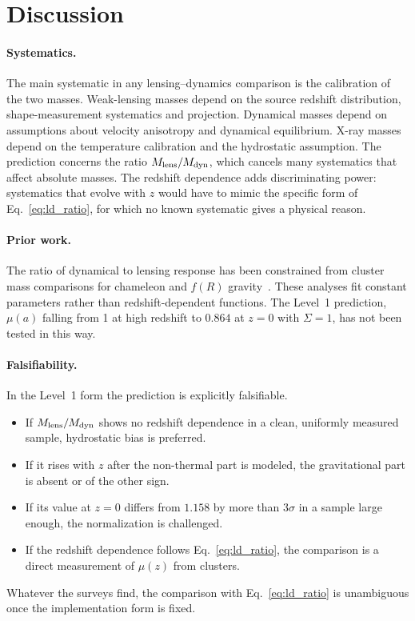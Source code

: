 \section{Discussion}\label{sec:ld_discussion}
\paragraph{Systematics.} The main systematic in any lensing--dynamics comparison is the calibration of the two masses. Weak-lensing masses depend on
the source redshift distribution, shape-measurement systematics and projection. Dynamical masses depend on assumptions about velocity anisotropy and
dynamical equilibrium. X-ray masses depend on the temperature calibration and the hydrostatic assumption. The prediction concerns the ratio
$M_{\rm lens}/M_{\rm dyn}$, which cancels many systematics that affect absolute masses. The redshift dependence adds discriminating power: systematics
that evolve with $z$ would have to mimic the specific form of Eq.~\eqref{eq:ld_ratio}, for which no known systematic gives a physical reason.
\interp

\paragraph{Prior work.} The ratio of dynamical to lensing response has been constrained from cluster mass comparisons for chameleon and $f(R)$
gravity~\cite{Terukina2014,Wilcox2015,Pizzuti2017}. These analyses fit constant parameters rather than redshift-dependent functions. The Level~1
prediction, $\mu(a)$ falling from 1 at high redshift to $0.864$ at $z=0$ with $\Sigma=1$, has not been tested in this way. \observed

\paragraph{Falsifiability.} In the Level~1 form the prediction is explicitly falsifiable. \prediction
\begin{itemize}
\item If $M_{\rm lens}/M_{\rm dyn}$ shows no redshift dependence in a clean, uniformly measured sample, hydrostatic bias is preferred.
\item If it rises with $z$ after the non-thermal part is modeled, the gravitational part is absent or of the other sign.
\item If its value at $z=0$ differs from $1.158$ by more than $3\sigma$ in a sample large enough, the normalization is challenged.
\item If the redshift dependence follows Eq.~\eqref{eq:ld_ratio}, the comparison is a direct measurement of $\mu(z)$ from clusters.
\end{itemize}
Whatever the surveys find, the comparison with Eq.~\eqref{eq:ld_ratio} is unambiguous once the implementation form is fixed.

